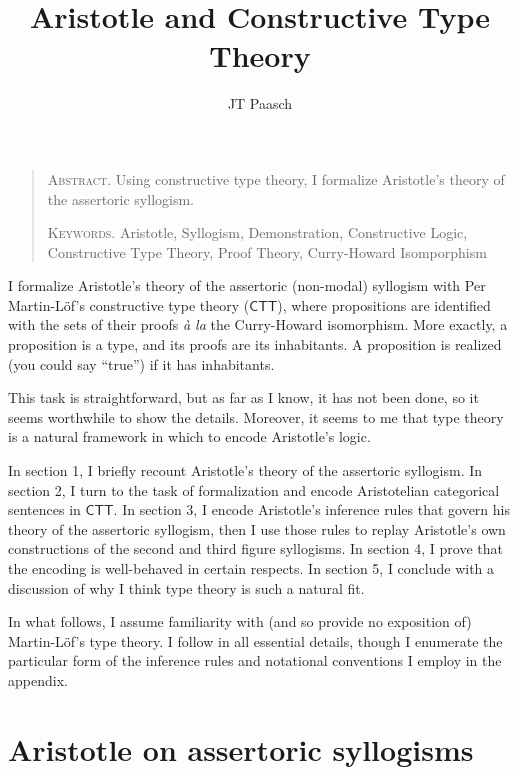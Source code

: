 \documentclass{article}
\newcommand\e{\mathsf}
\def\CTT/{$\e{CTT}$}
\begin{document}
\title{Aristotle and Constructive Type Theory}
\author{JT Paasch}
\date{}

\maketitle


\begin{quote}
    \textsc{Abstract}.
    Using constructive type theory, I formalize Aristotle's theory of the assertoric syllogism.

  \textsc{Keywords}. Aristotle, Syllogism, Demonstration, Constructive Logic, Constructive Type Theory, Proof Theory, Curry-Howard Isomporphism
\end{quote}

\noindent
I formalize Aristotle's theory of the assertoric (non-modal) syllogism with Per Martin-L\"of's constructive type theory (\CTT/), where propositions are identified with the sets of their proofs \emph{\`a la} the Curry-Howard isomorphism. More exactly, a proposition is a type, and its proofs are its inhabitants. A proposition is realized (you could say ``true'') if it has inhabitants.

This task is straightforward, but as far as I know, it has not been done, so it seems worthwhile to show the details. Moreover, it seems to me that type theory is a natural framework in which to encode Aristotle's logic.

In section 1, I briefly recount Aristotle's theory of the assertoric syllogism. In section 2, I turn to the task of formalization and encode Aristotelian categorical sentences in \CTT/. In section 3, I encode Aristotle's inference rules that govern his theory of the assertoric syllogism, then I use those rules to replay Aristotle's own constructions of the second and third figure syllogisms. In section 4, I prove that the encoding is well-behaved in certain respects. In section 5, I conclude with a discussion of why I think type theory is such a natural fit.

In what follows, I assume familiarity with (and so provide no exposition of) Martin-L\"of's type theory. I follow \citet{MartinLof1984} in all essential details, though I enumerate the particular form of the inference rules and notational conventions I employ in the appendix.


\section{Aristotle on assertoric syllogisms}
\end{document}
